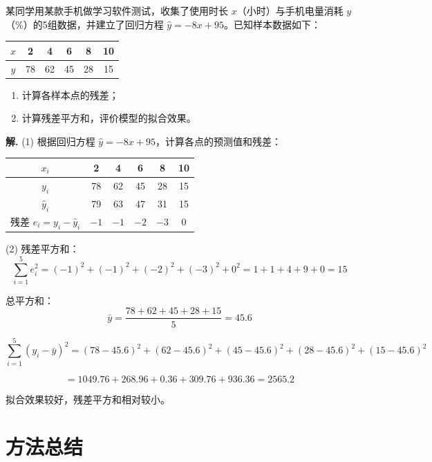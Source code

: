 \documentclass[11pt]{ctexrep}
\begin{document}
\begin{example}[残差分析]
    某同学用某款手机做学习软件测试，收集了使用时长 $x$（小时）与手机电量消耗 $y$（\%）的5组数据，并建立了回归方程 $\hat{y} = -8x + 95$。已知样本数据如下：

    \begin{center}
    \begin{tabular}{c|ccccc}
    \hline
    $x$ & 2 & 4 & 6 & 8 & 10 \\
    \hline
    $y$ & 78 & 62 & 45 & 28 & 15 \\
    \hline
    \end{tabular}
    \end{center}

    \begin{enumerate}
        \item 计算各样本点的残差；
        \item 计算残差平方和，评价模型的拟合效果。
    \end{enumerate}
\end{example}

\textbf{解.} (1) 根据回归方程 $\hat{y} = -8x + 95$，计算各点的预测值和残差：

\begin{center}
\begin{tabular}{c|ccccc}
\hline
$x_i$ & 2 & 4 & 6 & 8 & 10 \\
\hline
$y_i$ & 78 & 62 & 45 & 28 & 15 \\
$\hat{y}_i$ & 79 & 63 & 47 & 31 & 15 \\
残差 $e_i = y_i - \hat{y}_i$ & $-1$ & $-1$ & $-2$ & $-3$ & 0 \\
\hline
\end{tabular}
\end{center}

(2) 残差平方和：
\[
\sum_{i=1}^{5}e_i^2 = (-1)^2 + (-1)^2 + (-2)^2 + (-3)^2 + 0^2 = 1 + 1 + 4 + 9 + 0 = 15
\]

总平方和：
\[
\bar{y} = \frac{78+62+45+28+15}{5} = 45.6
\]

\[
\sum_{i=1}^{5}(y_i - \bar{y})^2 = (78-45.6)^2 + (62-45.6)^2 + (45-45.6)^2 + (28-45.6)^2 + (15-45.6)^2
\]

\[
= 1049.76 + 268.96 + 0.36 + 309.76 + 936.36 = 2565.2
\]

拟合效果较好，残差平方和相对较小。

\section*{方法总结}
\end{document}
